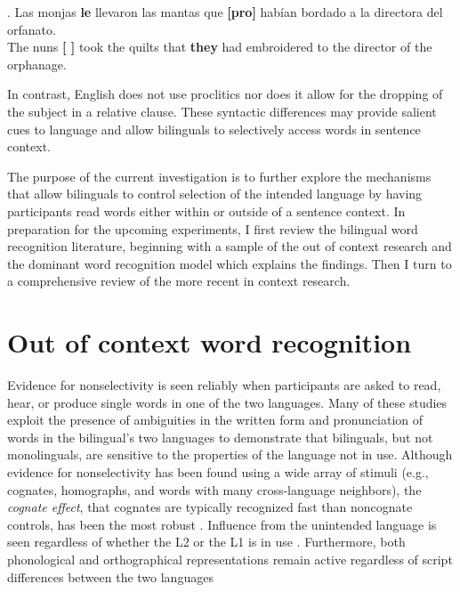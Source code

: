 \ex.\label{lasmonjas} Las monjas \textbf{le} llevaron las mantas que \textbf{[pro]} hab\'{i}an bordado a la directora del orfanato.\\
      The nuns \textbf{[ ]} took the quilts that \textbf{they} had embroidered to the director of the orphanage.

In contrast, English does not use proclitics nor does it allow for the dropping of the subject in a relative clause. These syntactic differences may provide salient cues to language and allow bilinguals to selectively access words in sentence context. 

The purpose of the current investigation is to further explore the mechanisms that allow bilinguals to control selection of the intended language by having participants read words either within or outside of a sentence context. In preparation for the upcoming experiments, I first review the bilingual word recognition literature, beginning with a sample of the out of context research and  the dominant word recognition model which explains the findings. Then I turn to a comprehensive review of the more recent in context research.

\section{Out of context word recognition}\label{Intro::OOC}
Evidence for nonselectivity is seen reliably when participants are asked to read, hear, or produce single words in one of the two languages. Many of these studies exploit the presence of ambiguities in the written form and pronunciation of words in the bilingual's two languages to demonstrate that bilinguals, but not monolinguals, are sensitive to the properties of the language not in use. Although evidence for nonselectivity has been found using a wide array of stimuli (e.g., cognates, homographs, and words with many cross-language neighbors), the \textit{cognate effect}, that cognates are typically recognized fast than noncognate controls, has been the most robust \parencite[e.g.,][]{Dijkstra1998}. Influence from the unintended language is seen regardless of whether the L2 or the L1 is in use \parencite[][]{Dijkstra1998, Grainger1992, Dijkstra1999, VanHell2002}. Furthermore, both phonological and orthographical representations remain active \parencite[e.g.,][]{Marian2003, Jared2001} regardless of script differences between the two languages \parencite[e.g.,][]{Gollan1997}

